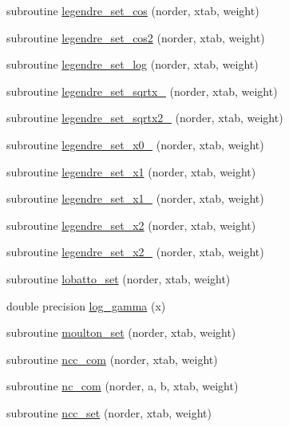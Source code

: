 \begin{DoxyCompactItemize}
\item 
subroutine \hyperlink{quadrule_8f90_a5bc99575d37146760cfa51cfccd5b400}{legendre\_\-set\_\-cos} (norder, xtab, weight)
\item 
subroutine \hyperlink{quadrule_8f90_acc5a8a6f431a042e02f59fbc20041ae0}{legendre\_\-set\_\-cos2} (norder, xtab, weight)
\item 
subroutine \hyperlink{quadrule_8f90_aa56be14b0d5564b164cc213f31c0d137}{legendre\_\-set\_\-log} (norder, xtab, weight)
\item 
subroutine \hyperlink{quadrule_8f90_a86c4a711a482034df5404bc3c78e55fd}{legendre\_\-set\_\-sqrtx\_} (norder, xtab, weight)
\item 
subroutine \hyperlink{quadrule_8f90_a66bcf2a4c79e18ca6f0bcd21e9a665ad}{legendre\_\-set\_\-sqrtx2\_} (norder, xtab, weight)
\item 
subroutine \hyperlink{quadrule_8f90_a1c24bdbb65fec4d3f0f0d2f066002c62}{legendre\_\-set\_\-x0\_} (norder, xtab, weight)
\item 
subroutine \hyperlink{quadrule_8f90_a18d682e70c431b86cae6a7d62b8148fa}{legendre\_\-set\_\-x1} (norder, xtab, weight)
\item 
subroutine \hyperlink{quadrule_8f90_a05a8f595777fdbdfaa618868856a48a5}{legendre\_\-set\_\-x1\_} (norder, xtab, weight)
\item 
subroutine \hyperlink{quadrule_8f90_a8323fd380b28f282745e9b88ab0f5a74}{legendre\_\-set\_\-x2} (norder, xtab, weight)
\item 
subroutine \hyperlink{quadrule_8f90_a82fb68c4ded02b55802a7f1768f66d76}{legendre\_\-set\_\-x2\_} (norder, xtab, weight)
\item 
subroutine \hyperlink{quadrule_8f90_a78a0044231676591f20f6a799a9177cd}{lobatto\_\-set} (norder, xtab, weight)
\item 
double precision \hyperlink{quadrule_8f90_a6bd375a88b7077d216c6532d98f9425c}{log\_\-gamma} (x)
\item 
subroutine \hyperlink{quadrule_8f90_a7b182dbe7e6b57c218f9a6d3f89b5130}{moulton\_\-set} (norder, xtab, weight)
\item 
subroutine \hyperlink{quadrule_8f90_a661d42ddf0d8116d8f9353e456918ca0}{ncc\_\-com} (norder, xtab, weight)
\item 
subroutine \hyperlink{quadrule_8f90_a0b336aacd3856d5d5e724522dd3e6e8a}{nc\_\-com} (norder, a, b, xtab, weight)
\item 
subroutine \hyperlink{quadrule_8f90_a45c034914a08b905c6dbe38d8ef5c5d9}{ncc\_\-set} (norder, xtab, weight)

\end{DoxyCompactItemize}
